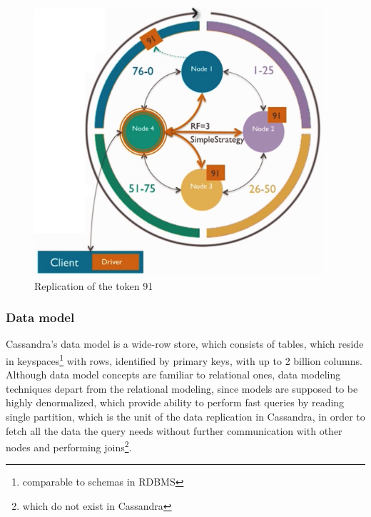 \begin{figure}[h]
	\centering
	\includegraphics[height=100mm]{images/cassandra-replication-ring.png}\hspace{10mm}
	\caption{Replication of the token 91}
	\label{fig:replicationRing}
\end{figure}





\subsubsection{Data model}
\label{sec:theory:cassandra:datamodel}
Cassandra's data model is a wide-row store, which consists of tables, which reside in keyspaces\footnote{comparable to schemas in RDBMS} with rows, identified by primary keys, with up to 2 billion columns. Although data model concepts are familiar to relational ones, data modeling techniques depart from the relational modeling, since models are supposed to be highly denormalized, which provide ability to perform fast queries by reading single partition, which is the unit of the data replication in Cassandra, in order to fetch all the data the query needs without further communication with other nodes and performing joins\footnote{which do not exist in Cassandra}.


